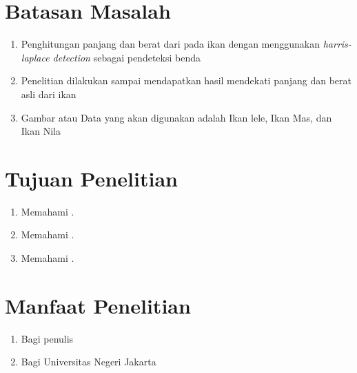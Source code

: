 \section{Batasan Masalah}
\begin{enumerate}
	\item Penghitungan panjang dan berat dari pada ikan dengan menggunakan \emph{harris-laplace detection} sebagai pendeteksi benda
	\item Penelitian dilakukan sampai mendapatkan hasil mendekati panjang dan berat asli dari ikan
	\item Gambar atau Data yang akan digunakan adalah Ikan lele, Ikan Mas, dan Ikan Nila
\end{enumerate}
	
\section{Tujuan Penelitian}
\begin{enumerate}
	\item Memahami .
	\item Memahami .
	\item Memahami .
\end{enumerate}

\section{Manfaat Penelitian}
\begin{enumerate}
	\item Bagi penulis
	

		
	\item Bagi Universitas Negeri Jakarta
	
	
			
\end{enumerate}

\begin{comment}

\end{comment}
